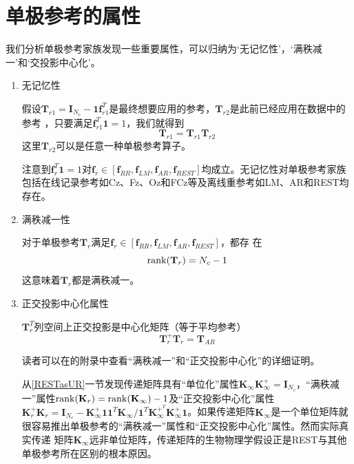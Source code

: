 \section{单极参考的属性}
我们分析单极参考家族发现一些重要属性，可以归纳为‘无记忆性’，‘满秩减一’和‘交投影中心化’。
\begin{enumerate}[label=(\roman*)]
\item 无记忆性

假设$\mathbf{T}_{r1}=\mathbf{I}_{N_c}-\mathbf{1f}_{r1}^T$是最终想要应用的参考，$\mathbf{T}_{r2}$是此前已经应用在数据中的参考
，只要满足$\mathbf{f}_{r1}^T\mathbf{1}=1$，我们就得到
\begin{equation}\label{eq4.12}
\mathbf{T}_{r1}=\mathbf{T}_{r1}\mathbf{T}_{r2}
\end{equation}
这里$\mathbf{T}_{r2}$可以是任意一种单极参考算子。

注意到$\mathbf{f}_r^T\mathbf{1}=1$对$\mathbf{f}_r\in{[\mathbf{f}_{RR},\mathbf{f}_{LM},\mathbf{f}_{AR},\mathbf{f}_{REST}]}$均成立。无记忆性对单极参考家族包括在线记录参考如Cz、Fz、Oz和FCz等及离线重参考如LM、AR和REST均存在。

\item 满秩减一性

对于单极参考$\mathbf{T}_r$满足$\mathbf{f}_r\in{[\mathbf{f}_{RR},\mathbf{f}_{LM},\mathbf{f}_{AR},\mathbf{f}_{REST}]}$，都存
在
\begin{equation}\label{eq4.13}
\operatorname{rank}(\mathbf{T}_r)=N_c-1
\end{equation}
这意味着$\mathbf{T}_r$都是满秩减一。

\item 正交投影中心化属性

$\mathbf{T}_r^T$列空间上正交投影是中心化矩阵（等于平均参考）
\begin{equation}\label{eq4.14}
\mathbf{T}_r^+\mathbf{T}_r=\mathbf{T}_{AR}
\end{equation}

读者可以在\cite{hu_unified_2018}的附录中查看“满秩减一”和“正交投影中心化”的详细证明。

从\ref{RESTasUR}一节发现传递矩阵具有“单位化”属性$\mathbf{K}_{\infty}\mathbf{K}_{\infty}^+=\mathbf{I}_{N_c}$，“满秩减一”属性$\operatorname{rank}(\mathbf{K}_r)=\operatorname{rank}(\mathbf{K}_{\infty})-1$及“正交投影中心化”属性$\mathbf{K}_r^+\mathbf{K}_r=\mathbf{I}_{N_c}-\mathbf{K}_{\infty}^+\mathbf{11}^T\mathbf{K}_{\infty}/{\mathbf{1}^T\mathbf{K}_{\infty}^{+^T}\mathbf{K}_{\infty}^+\mathbf{1}}$。如果传递矩阵$\mathbf{K}_{\infty}$是一个单位矩阵就很容易推出单极参考的“满秩减一”属性和“正交投影中心化”属性。然而实际真实传递
矩阵$\mathbf{K}_{\infty}$远非单位矩阵，传递矩阵的生物物理学假设正是REST与其他单极参考所在区别的根本原因。
\end{enumerate}

